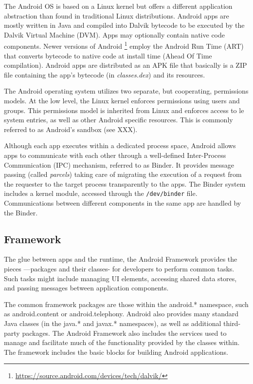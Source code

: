 The Android OS is based on a Linux kernel but offers a different application abstraction than found in traditional Linux distributions. Android apps are mostly written in Java and compiled into Dalvik bytecode to be executed by the Dalvik Virtual Machine (DVM). Apps may optionally contain native code components. Newer versions of Android \footnote{\url{https://source.android.com/devices/tech/dalvik/}} employ the Android Run Time (ART) that converts bytecode to native code at install time (Ahead Of Time compilation). Android apps are distributed as an APK file that basically is a ZIP file containing the app's bytecode (in \textit{classes.dex}) and its resources. 

The Android operating system utilizes two separate, but cooperating, permissions models. At the low level, the Linux kernel enforces permissions using users and groups. This permissions model is inherited from Linux and enforces access to  le system entries, as well as other Android specific resources. This is commonly referred to as Android’s sandbox (see XXX).



Although each app executes within a dedicated process space, Android allows apps to communicate with each other through a well-defined Inter-Process Communication (IPC) mechanism, referred to as Binder. It provides message passing (called \textit{parcels}) taking care of migrating the execution of a request from the requester to the target process transparently to the apps. The Binder system includes a kernel module, accessed through the \texttt{/dev/binder} file. Communications between different components in the same app are handled by the Binder. 

\subsection{Framework}

The glue between apps and the runtime, the Android Framework provides the pieces —packages and their classes- for developers to perform common tasks. Such tasks might include managing UI elements, accessing shared data stores, and passing messages between application components. 

The common framework packages are those within the android.* namespace, such as android.content or android.telephony. Android also provides many standard Java classes (in the java.* and javax.* namespaces), as well as additional third-party packages. The Android Framework also includes the services used to manage and facilitate much of the functionality provided by the classes within. The framework includes the basic blocks for building Android applications.

